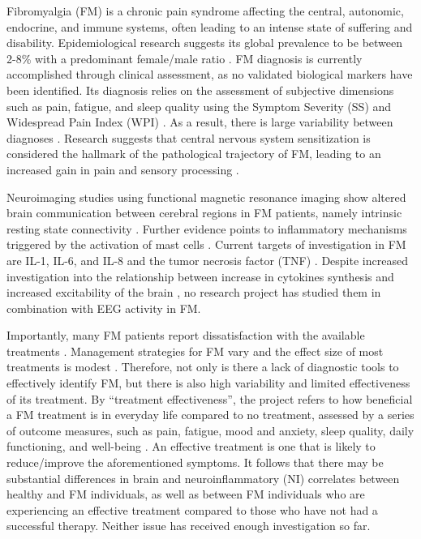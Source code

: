 \documentclass[twocolumn, serif, rga, numeric]{jote-article}
\begin{document}
Fibromyalgia (FM) is a chronic pain syndrome affecting the central,
autonomic, endocrine, and immune systems, often leading to an intense
state of suffering and disability. Epidemiological research suggests its
global prevalence to be between 2-8\% with a predominant female/male
ratio \cite{Clauw2014}. FM diagnosis is currently accomplished through
clinical assessment, as no validated biological markers have been
identified. Its diagnosis relies on the assessment of subjective
dimensions such as pain, fatigue, and sleep quality using the Symptom
Severity (SS) and Widespread Pain Index (WPI) \cite{Wolfe2010}. As a
result, there is large variability between diagnoses \cite{Walitt2016}.
Research suggests that central nervous system sensitization is
considered the hallmark of the pathological trajectory of FM, leading to
an increased gain in pain and sensory processing \cite{Sluka2016}.

Neuroimaging studies using functional magnetic resonance imaging show
altered brain communication between cerebral regions in FM patients,
namely intrinsic resting state connectivity \cite{Napadow2012,Napadow2010}.
Further evidence points to inflammatory mechanisms triggered by the
activation of mast cells \cite{Chatterjea2015}. Current targets of
investigation in FM are IL-1, IL-6, and IL-8 and the tumor necrosis
factor (TNF) \cite{Theoharides2015}. Despite increased investigation into
the relationship between increase in cytokines synthesis and increased
excitability of the brain \cite{Galic2012}, no research project has
studied them in combination with EEG activity in FM.

Importantly, many FM patients report dissatisfaction with the available
treatments \cite{Lauche2013}. Management strategies for FM vary and
the effect size of most treatments is modest \cite{Macfarlane2016}.
Therefore, not only is there a lack of diagnostic tools to effectively
identify FM, but there is also high variability and limited
effectiveness of its treatment. By ``treatment effectiveness'', the
project refers to how beneficial a FM treatment is in everyday life
compared to no treatment, assessed by a series of outcome measures, such
as pain, fatigue, mood and anxiety, sleep quality, daily functioning,
and well-being \cite{Carville2008}. An effective treatment is one that
is likely to reduce/improve the aforementioned symptoms. It follows that
there may be substantial differences in brain and neuroinflammatory (NI)
correlates between healthy and FM individuals, as well as between FM
individuals who are experiencing an effective treatment compared to
those who have not had a successful therapy. Neither issue has received
enough investigation so far.
\end{document}
